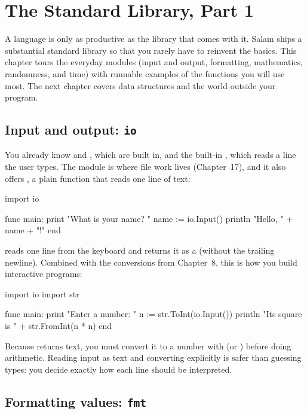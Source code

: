 \chapter{The Standard Library, Part 1}%
\label{ch:stdlib-1}

A language is only as productive as the library that comes with it. Salam ships a
substantial standard library so that you rarely have to reinvent the basics. This
chapter tours the everyday modules (input and output, formatting, mathematics,
randomness, and time) with runnable examples of the functions you will use most.
The next chapter covers data structures and the world outside your program.

\section{Input and output: \texttt{io}}

You already know  and , which are built in, and the
built-in , which reads a line the user types. The 
module is where file work lives (Chapter~17), and it also offers
, a plain function that reads one line of text:

\begin{salamen}
import io

func main:
    print "What is your name? "
    name := io.Input()
    println "Hello, " + name + "!"
end
\end{salamen}

 reads one line from the keyboard and returns it as a 
(without the trailing newline). Combined with the  conversions from
Chapter~8, this is how you build interactive programs:

\begin{salamen}
import io
import str

func main:
    print "Enter a number: "
    n := str.ToInt(io.Input())
    println "Its square is " + str.FromInt(n * n)
end
\end{salamen}

\begin{note}
Because  returns text, you must convert it to a number with
 (or ) before doing arithmetic. Reading input as
text and converting explicitly is safer than guessing types: you decide exactly
how each line should be interpreted.
\end{note}

\section{Formatting values: \texttt{fmt}}

